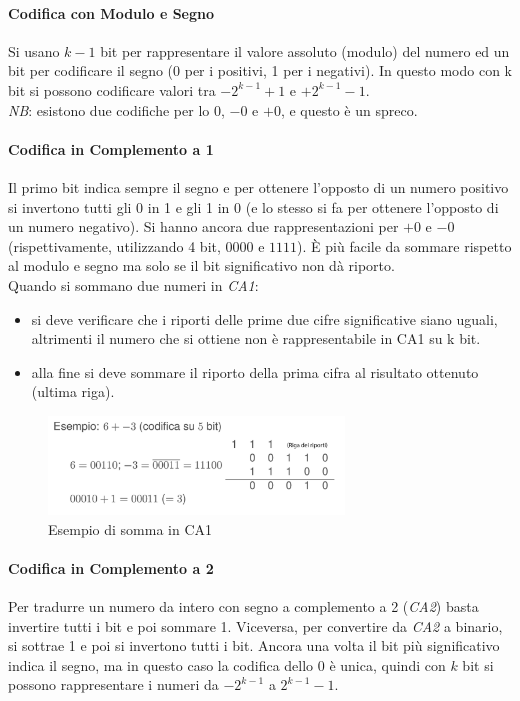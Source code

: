 \documentclass[class=book, crop=false, oneside]{standalone}
\begin{document}
\paragraph*{Codifica con Modulo e Segno}
Si usano \(k-1\) bit per rappresentare il valore assoluto (modulo) del numero  ed un bit per codificare il segno (0 per i positivi, 1 per i negativi). In questo modo con k bit si possono codificare valori tra \(-2^{k-1}+1\) e \(+2^{k-1}-1\).\\
\emph{NB}: esistono due codifiche per lo \(0\), \(-0\) e \(+0\), e questo è un spreco.

\paragraph*{Codifica in Complemento a 1}
Il primo bit indica sempre il segno e per ottenere l'opposto di un numero positivo si invertono tutti gli 0 in 1 e gli 1 in 0 (e lo stesso si fa per ottenere l’opposto di un numero negativo). Si hanno ancora due rappresentazioni per \(+0\) e \(-0\) (rispettivamente, utilizzando 4 bit, \(0000\) e \(1111\)). È più facile da sommare rispetto al modulo e segno ma solo se il bit significativo non dà riporto.\\
Quando si sommano due numeri in \emph{CA1}:
\begin{itemize}[noitemsep]
	\item si deve verificare che i riporti delle prime due cifre significative siano uguali, altrimenti il numero che si ottiene non è rappresentabile in CA1 su k bit.
	\item alla fine si deve sommare il riporto della prima cifra al risultato ottenuto (ultima riga).
\end{itemize}

\begin{figure}[h!]
	\centering
	\includegraphics[width=0.7\textwidth,keepaspectratio]{Somma-CA1.png}
	\caption{Esempio di somma in CA1}
\end{figure}

\paragraph*{Codifica in Complemento a 2}
Per tradurre un numero da intero con segno a complemento a 2 (\emph{CA2}) basta invertire tutti i bit e poi sommare 1. Viceversa, per convertire da \emph{CA2} a binario, si sottrae 1 e poi si invertono tutti i bit. Ancora una volta il bit più significativo indica il segno, ma in questo caso la codifica dello 0 è unica, quindi con \(k\) bit si possono rappresentare i numeri da \(-2^{k-1}\) a \(2^{k-1}-1\).
\end{document}
